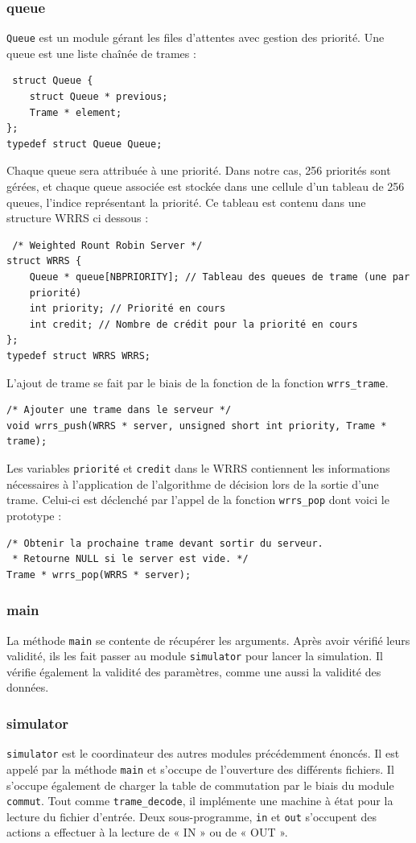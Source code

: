 \documentclass[a4paper,11pt]{article}
\begin{document}
\subsubsection{queue}
\texttt{Queue} est un module gérant les files d'attentes avec gestion
des priorité. Une queue est une liste chaînée de trames :
\begin{verbatim}
 struct Queue {
    struct Queue * previous;
    Trame * element;
};
typedef struct Queue Queue;
\end{verbatim}
Chaque queue sera attribuée à une priorité. Dans notre cas, 256 priorités
sont gérées, et chaque queue associée est stockée dans une cellule d'un
tableau de 256 queues, l'indice représentant la priorité.
Ce tableau est contenu dans une structure WRRS ci dessous :
\begin{verbatim}
 /* Weighted Rount Robin Server */
struct WRRS {
    Queue * queue[NBPRIORITY]; // Tableau des queues de trame (une par
    priorité)
    int priority; // Priorité en cours
    int credit; // Nombre de crédit pour la priorité en cours
};
typedef struct WRRS WRRS;
\end{verbatim}
L'ajout de trame se fait par le biais de la fonction de la fonction
\texttt{wrrs\_trame}.
\begin{verbatim}
/* Ajouter une trame dans le serveur */
void wrrs_push(WRRS * server, unsigned short int priority, Trame * trame);
\end{verbatim}
Les variables \texttt{priorité} et \texttt{credit} dans le WRRS
contiennent les informations nécessaires à l'application de l'algorithme
de décision lors de la sortie d'une trame. Celui-ci est déclenché par
l'appel de la fonction \texttt{wrrs\_pop} dont voici le prototype :
\begin{verbatim}
/* Obtenir la prochaine trame devant sortir du serveur.
 * Retourne NULL si le server est vide. */
Trame * wrrs_pop(WRRS * server);
\end{verbatim}

\subsubsection{main}
La méthode \texttt{main} se contente de récupérer les arguments. Après
avoir vérifié leurs validité, ils les fait passer au module
\texttt{simulator} pour lancer la simulation. Il vérifie également la
validité des paramètres, comme une  aussi la validité des données.

\subsubsection{simulator}
\texttt{simulator} est le coordinateur des autres modules
précédemment énoncés. Il est appelé par la méthode \texttt{main} et
s'occupe de l'ouverture des différents fichiers. Il s'occupe également de
charger la table de commutation par le biais du module \texttt{commut}.
Tout comme \texttt{trame\_decode}, il implémente une machine à état pour
la lecture du fichier d'entrée. Deux sous-programme, \texttt{in} et
\texttt{out} s'occupent des actions a effectuer à la lecture de « IN »
ou de « OUT ».
\end{document}
